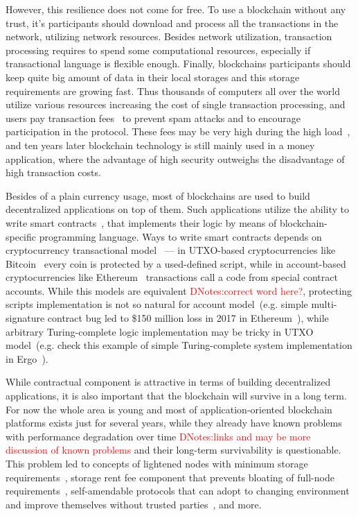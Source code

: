 \documentclass[]{article}
\newcommand{\dnote}[1]{{\textcolor{red}{DNotes:{#1}}}}
\newcommand{\Ergo}{Ergo}
\begin{document}
    However, this resilience does not come for free.
    To use a blockchain without any trust, it's participants should download and process all the transactions in
    the network, utilizing network resources.
    Besides network utilization, transaction processing requires to spend some computational resources,
    especially if transactional language is flexible enough.
    Finally, blockchains participants should keep quite big amount of data in their local storages and
    this storage requirements are growing fast.
    Thus thousands of computers all over the world utilize various resources
    increasing the cost of single transaction processing,
    and users pay transaction fees~\cite{A Systematic Approach To Cryptocurrency Fees} to prevent spam attacks and
    to encourage participation in the protocol.
    These fees may be very high during the high load~\cite{https://arstechnica.com/tech-policy/2017/12/bitcoin-fees-rising-high/},
    and ten years later blockchain technology is still mainly used in a money application, where the advantage of
    high security outweighs the disadvantage of high transaction costs.

    Besides of a plain currency usage, most of blockchains are used to build decentralized applications on top of them.
    Such applications utilize the ability to write smart contracts~\cite{n.sabo}, that implements their logic
    by means of blockchain-specific programming language.
    Ways to write smart contracts depends on cryptocurrency transactional model~\cite{https://eprint.iacr.org/2018/262.pdf} ---
    in UTXO-based cryptocurrencies like Bitcoin~\cite{nakamoto2008bitcoin} every coin is protected by a used-defined script,
    while in account-based cryptocurrencies like Ethereum~\cite{ETH whitepaper} transactions call a code from special contract accounts.
    While this models are equivalent \dnote{correct word here?}, protecting scripts implementation is not so natural for
    account model~(e.g. simple multi-signature contract bug led to \$150 million loss in 2017 in Ethereum~\cite{https://www.ccn.com/i-accidentally-killed-it-parity-wallet-bug-locks-150-million-in-ether}),
    while arbitrary Turing-complete logic implementation may be tricky in UTXO model~(e.g. check this example of
    simple Turing-complete system implementation in \Ergo{}~\cite{chepurnoy2018self}).

    While contractual component is attractive in terms of building decentralized applications,
    it is also important that the blockchain will survive in a long term.
    For now the whole area is young and most of application-oriented blockchain platforms exists just for several years,
    while they already have known problems with performance degradation over time \dnote{links and may be more discussion of known problems}
    and their long-term survivability is questionable.
    This problem led to concepts of lightened nodes with minimum storage requirements~\cite{reyzin2017improving},
    storage rent fee component that prevents bloating of full-node requirements~\cite{chepurnoy2018systematic},
    self-amendable protocols that can adopt to changing environment and improve themselves without
    trusted parties~\cite{tezos}, and more.
\end{document}
